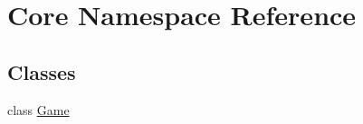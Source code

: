 \hypertarget{namespace_core}{\section{Core Namespace Reference}
\label{namespace_core}
}
\subsection*{Classes}
\begin{DoxyCompactItemize}
\item 
class \hyperlink{class_core_1_1_game}{Game}
\end{DoxyCompactItemize}
